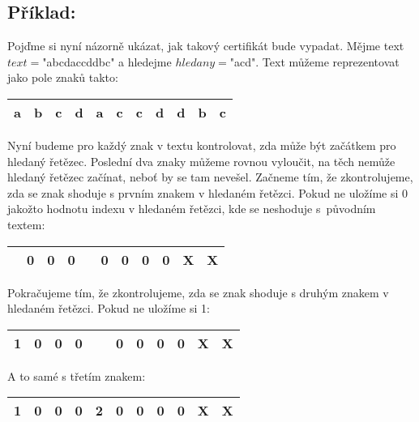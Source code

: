 \documentclass{article}
\begin{document}
\subsection{Příklad:}
Pojďme si nyní názorně ukázat, jak takový certifikát bude vypadat. Mějme text $text=$"abcdaccddbc" a hledejme $hledany=$"acd". Text můžeme reprezentovat jako pole znaků takto:

\begin{table}[H]\centering

\begin{tabular}{|c|c|c|c|c|c|c|c|c|c|c|}
        \hline a & b & c & d & a & c & c & d & d & b & c \\ \hline
    	\end{tabular}
\end{table}

Nyní budeme pro každý znak v textu kontrolovat, zda může být začátkem pro hledaný řetězec. Poslední dva znaky můžeme rovnou vyloučit, na těch nemůže hledaný řetězec začínat, neboť by se tam nevešel. Začneme tím, že zkontrolujeme, zda se znak shoduje s prvním znakem v hledaném řetězci. Pokud ne uložíme si 0 jakožto hodnotu indexu v hledaném řetězci, kde se neshoduje s~původním textem:

\begin{table}[H]\centering

\begin{tabular}{|c|c|c|c|c|c|c|c|c|c|c|}
        \hline  & 0 & 0 & 0 &  & 0 & 0 & 0 & 0 & X & X \\ \hline
    	\end{tabular}
\end{table}

Pokračujeme tím, že zkontrolujeme, zda se znak shoduje s druhým znakem v hledaném řetězci. Pokud ne uložíme si 1:

\begin{table}[H]\centering

\begin{tabular}{|c|c|c|c|c|c|c|c|c|c|c|}
        \hline 1 & 0 & 0 & 0 & \  & 0 & 0 & 0 & 0 & X & X \\ \hline
    	\end{tabular}
\end{table}

A to samé s třetím znakem: 

\begin{table}[H]\centering

\begin{tabular}{|c|c|c|c|c|c|c|c|c|c|c|}
        \hline 1 & 0 & 0 & 0 & 2 & 0 & 0 & 0 & 0 & X & X \\ \hline
    	\end{tabular}
\end{table}
\end{document}
